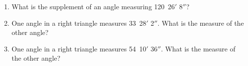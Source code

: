 \documentclass[12pt,fleqn]{article} %
\begin{document}
\begin{enumerate}
  \item What is the supplement of an angle measuring 120\degree\ 26$'$ 8$''$?
  \spacing

  \item One angle in a right triangle measures 33\degree\ 28$'$ 2$''$. What is the measure of the other angle? 
  \spacing

  \item One angle in a right triangle measures 54\degree\ 10$'$ 36$''$. What is the measure of the other angle? 
  \spacing

\end{enumerate}
\end{document}
